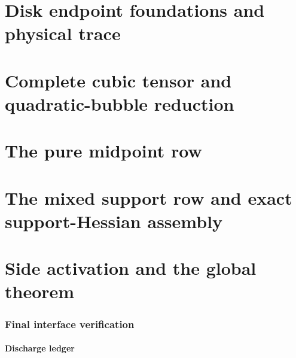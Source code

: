 \documentclass[11pt]{amsart}
\begin{document}
\part{Disk endpoint foundations and physical trace}







\part{Complete cubic tensor and quadratic-bubble reduction}




\part{The pure midpoint row}







\part{The mixed support row and exact support-Hessian assembly}






\part{Side activation and the global theorem}





\section{Final interface verification}
\label{sec:final-interface-verification}

\subsection{Discharge ledger}
\end{document}
